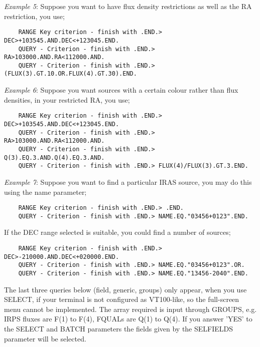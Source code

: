 {\em Example 5}: Suppose you want to have flux density restrictions as well as
the RA restriction, you use;
\begin{verbatim}
    RANGE Key criterion - finish with .END.> DEC>+103545.AND.DEC<+123045.END.
    QUERY - Criterion - finish with .END.> RA>103000.AND.RA<112000.AND.
    QUERY - Criterion - finish with .END.> (FLUX(3).GT.10.OR.FLUX(4).GT.30).END.
\end{verbatim}
{\em Example 6}: Suppose you want sources with a certain colour rather than
flux densities, in your restricted RA, you use;
\begin{verbatim}
    RANGE Key criterion - finish with .END.> DEC>+103545.AND.DEC<+123045.END.
    QUERY - Criterion - finish with .END.> RA>103000.AND.RA<112000.AND.
    QUERY - Criterion - finish with .END.> Q(3).EQ.3.AND.Q(4).EQ.3.AND.
    QUERY - Criterion - finish with .END.> FLUX(4)/FLUX(3).GT.3.END.
\end{verbatim}
{\em Example 7}: Suppose you want to find a particular IRAS source, you may
do this using the name parameter;
\begin{verbatim}
    RANGE Key criterion - finish with .END.> .END.
    QUERY - Criterion - finish with .END.> NAME.EQ."03456+0123".END.
\end{verbatim}
If the DEC range selected is suitable, you could find a number of sources;
\begin{verbatim}
    RANGE Key criterion - finish with .END.> DEC>-210000.AND.DEC<+020000.END.
    QUERY - Criterion - finish with .END.> NAME.EQ."03456+0123".OR.
    QUERY - Criterion - finish with .END.> NAME.EQ."13456-2040".END.
\end{verbatim}

The last three queries below (field, generic, groups) only appear, when you use
SELECT, if your terminal is not configured as VT100-like, so the full-screen
menu cannot be implemented.
The array required is input through GROUPS, e.g. IRPS fluxes are F(1) to
F(4), FQUALs are Q(1) to Q(4).
If you answer 'YES' to the SELECT and BATCH parameters the fields given by the
SELFIELDS parameter will be selected.

